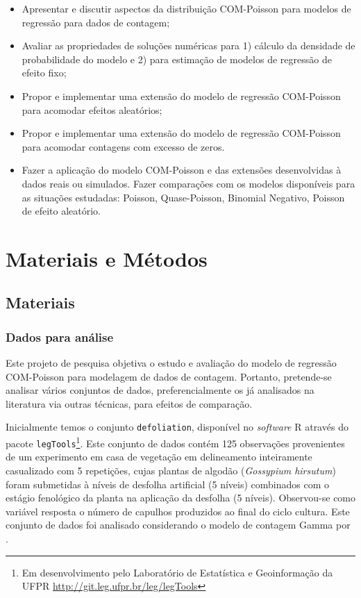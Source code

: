\documentclass[
12pt,				%
openright,			%
oneside,			%
a4paper,			%
english,			%
brazil,				%
]{abntex2}
\begin{document}
\begin{itemize}
\item Apresentar e discutir aspectos da distribuição COM-Poisson para
  modelos de regressão para dados de contagem;
  
\item Avaliar as propriedades de soluções numéricas para 1) cálculo da
  densidade de probabilidade do modelo e 2) para estimação de modelos de 
  regressão de efeito fixo;
  
\item Propor e implementar uma extensão do modelo de regressão
  COM-Poisson para acomodar efeitos aleatórios;
  
\item Propor e implementar uma extensão do modelo de regressão
  COM-Poisson para acomodar contagens com excesso de zeros.
  
\item Fazer a aplicação do modelo COM-Poisson e das extensões
  desenvolvidas à dados reais ou simulados. Fazer comparações com os
  modelos disponíveis para as situações estudadas: Poisson,
  Quase-Poisson, Binomial Negativo, Poisson de efeito aleatório.
\end{itemize}

\chapter{Materiais e Métodos}
\label{cha:materiaisemetodos}

\section{Materiais}
\label{sec:materiais}

\subsection{Dados para análise}
\label{sec:dados}

Este projeto de pesquisa objetiva o estudo e avaliação do modelo de
regressão 
COM-Poisson para modelagem de dados de contagem. Portanto, pretende-se
analisar vários conjuntos de dados, preferencialmente os já analisados
na literatura via outras técnicas, para efeitos de comparação.

Inicialmente temos o conjunto \texttt{defoliation}, disponível no
\textit{software} R através do pacote \texttt{legTools}\footnote{Em
  desenvolvimento pelo Laboratório de Estatística e Geoinformação da
  UFPR \url{http://git.leg.ufpr.br/leg/legTools}}. Este conjunto de
dados contém 125 observações provenientes de um experimento em casa de
vegetação em delineamento inteiramente casualizado com 5 repetições,
cujas plantas de 
algodão (\textit{Gossypium hirsutum}) foram submetidas à níveis de
desfolha artificial (5 níveis) combinados com o estágio fenológico da
planta na aplicação da desfolha (5 níveis). Observou-se como variável
resposta o número de capulhos produzidos ao final do ciclo cultura. Este
conjunto de dados foi analisado considerando o modelo de contagem Gamma
por .
\end{document}
